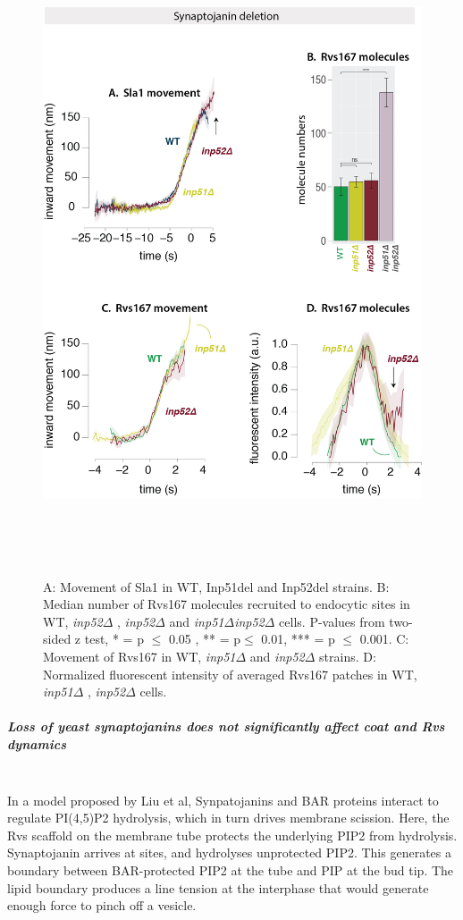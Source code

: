 			\begin{figure}
			\centering
			\includegraphics[width=19cm,height=19cm,keepaspectratio]{figures/results_final/inp_movement3}
			\caption[Synaptojanin deletion]
			{A: Movement of Sla1 in WT, Inp51del and Inp52del strains. 
			B: Median number of Rvs167 molecules recruited to endocytic sites in WT, \textit{inp52$\Delta$ }, \textit{inp52$\Delta$ } and \textit{inp51$\Delta$inp52$\Delta$ } cells. P-values from two-sided z test,  * = p $\leq$ 0.05 , ** = p$\leq$ 0.01, *** = p $\leq$ 0.001.  
			C: Movement of Rvs167 in WT, \textit{inp51$\Delta$ } and \textit{inp52$\Delta$ } strains. 
			D: Normalized fluorescent intensity of averaged Rvs167 patches in WT, \textit{inp51$\Delta$ }, \textit{inp52$\Delta$ } cells.
			\label{fig_inpmov}}
			\end{figure}

		\subparagraph{Loss of yeast synaptojanins does not significantly affect coat and Rvs dynamics}
		\mbox{}\\
		In a model proposed by Liu et al, Synpatojanins and BAR proteins interact to regulate PI(4,5)P2 hydrolysis, which in turn drives membrane scission. Here, the Rvs scaffold on the membrane tube protects the underlying PIP2 from hydrolysis. Synaptojanin arrives at sites, and hydrolyses unprotected PIP2. This generates a boundary between BAR-protected PIP2 at the tube and PIP at the bud tip. The lipid boundary produces a line tension at the interphase that would generate enough force to pinch off a vesicle. 


